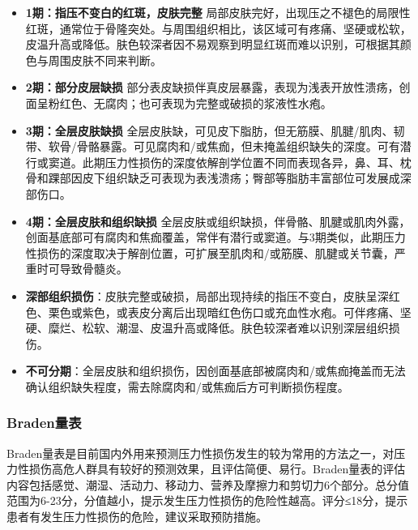\documentclass[11pt, a4paper]{ctexart}
\begin{document}
\begin{itemize}
    \item \textbf{1期：指压不变白的红斑，皮肤完整} 局部皮肤完好，出现压之不褪色的局限性红斑，通常位于骨隆突处。与周围组织相比，该区域可有疼痛、坚硬或松软，皮温升高或降低。肤色较深者因不易观察到明显红斑而难以识别，可根据其颜色与周围皮肤不同来判断。
    \item \textbf{2期：部分皮层缺损} 部分表皮缺损伴真皮层暴露，表现为浅表开放性溃疡，创面呈粉红色、无腐肉；也可表现为完整或破损的浆液性水疱。
    \item \textbf{3期：全层皮肤缺损} 全层皮肤缺，可见皮下脂肪，但无筋膜、肌腱/肌肉、韧带、软骨/骨骼暴露。可见腐肉和/或焦痂，但未掩盖组织缺失的深度。可有潜行或窦道。此期压力性损伤的深度依解剖学位置不同而表现各异，鼻、耳、枕骨和踝部因皮下组织缺乏可表现为表浅溃疡；臀部等脂肪丰富部位可发展成深部伤口。
    \item \textbf{4期：全层皮肤和组织缺损} 全层皮肤或组织缺损，伴骨骼、肌腱或肌肉外露，创面基底部可有腐肉和焦痂覆盖，常伴有潜行或窦道。与3期类似，此期压力性损伤的深度取决于解剖位置，可扩展至肌肉和/或筋膜、肌腱或关节囊，严重时可导致骨髓炎。
    \item \textbf{深部组织损伤}：皮肤完整或破损，局部出现持续的指压不变白，皮肤呈深红色、栗色或紫色，或表皮分离后出现暗红色伤口或充血性水疱。可伴疼痛、坚硬、糜烂、松软、潮湿、皮温升高或降低。肤色较深者难以识别深层组织损伤。
    \item \textbf{不可分期}：全层皮肤和组织损伤，因创面基底部被腐肉和/或焦痂掩盖而无法确认组织缺失程度，需去除腐肉和/或焦痂后方可判断损伤程度。
\end{itemize}

\subsubsection{Braden量表}
Braden量表是目前国内外用来预测压力性损伤发生的较为常用的方法之一，对压力性损伤高危人群具有较好的预测效果，且评估简便、易行。Braden量表的评估内容包括感觉、潮湿、活动力、移动力、营养及摩擦力和剪切力6个部分。总分值范围为6-23分，分值越小，提示发生压力性损伤的危险性越高。评分≤18分，提示患者有发生压力性损伤的危险，建议采取预防措施。
\end{document}
